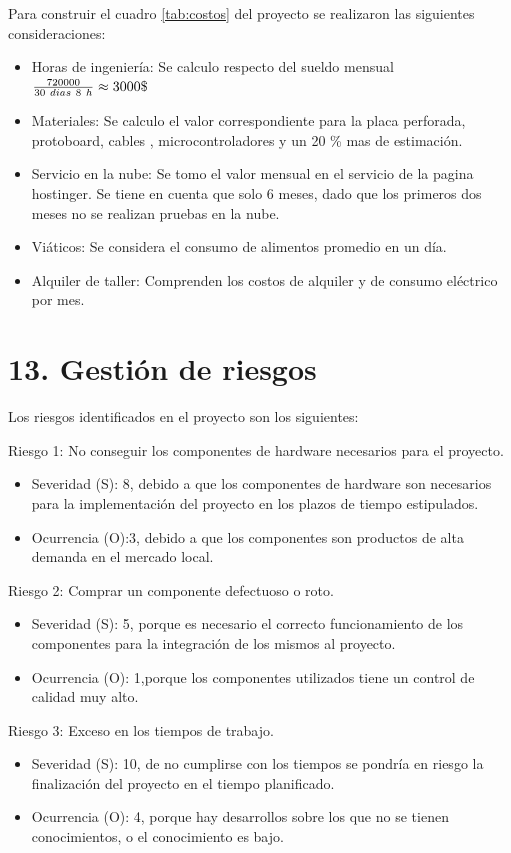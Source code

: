 \documentclass[
11pt, %
]{charter}
\begin{document}
Para construir el cuadro \ref{tab:costos} del proyecto se realizaron las siguientes consideraciones:

\begin{itemize}
\item Horas de ingeniería: Se calculo respecto del sueldo  mensual  $\frac{720000}{30\  dias\ \* 8\ h } \approx 3000\$ $
\item Materiales: Se calculo el valor correspondiente para la placa perforada, protoboard, cables , microcontroladores y un 20 \% mas de estimación.
\item Servicio en la nube: Se tomo el valor mensual en el servicio de la pagina hostinger. Se tiene en cuenta que solo 6 meses, dado que los primeros dos meses no se realizan pruebas en la nube.
\item Viáticos: Se considera el consumo de alimentos promedio en un día.
\item Alquiler de taller: Comprenden los costos de alquiler y de consumo eléctrico por mes.
\end{itemize}


\section{13. Gestión de riesgos}
\label{sec:riesgos}

Los riesgos identificados en el proyecto son los siguientes:


Riesgo 1: No conseguir los componentes de hardware necesarios  para el proyecto.
\begin{itemize}
	\item Severidad (S): 8, debido a que los componentes de hardware son necesarios para la implementación del proyecto en los plazos de tiempo estipulados. 
	\item Ocurrencia (O):3, debido a que los componentes son productos de alta demanda en el mercado local.
\end{itemize}

Riesgo 2: Comprar un componente defectuoso o roto.
\begin{itemize}
	\item Severidad (S): 5, porque es necesario el correcto funcionamiento de los componentes  para la integración de los mismos al proyecto.
	\item Ocurrencia (O): 1,porque los componentes utilizados tiene un control de calidad muy alto.
\end{itemize}

Riesgo 3: Exceso en los tiempos de trabajo.
\begin{itemize}
	\item Severidad (S): 10, de no cumplirse con los tiempos se pondría en riesgo la finalización del proyecto en el tiempo planificado. 
	\item Ocurrencia (O): 4, porque hay desarrollos sobre los que no se tienen conocimientos, o el conocimiento es bajo.
\end{itemize}
\end{document}
